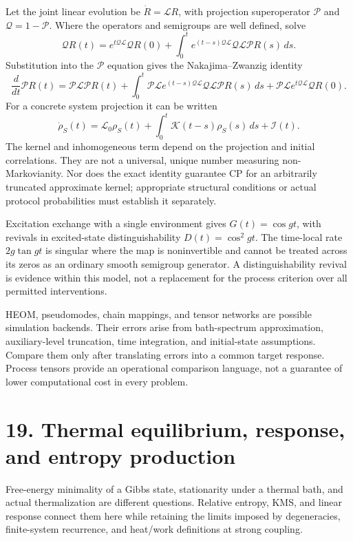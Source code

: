\documentclass[
  11pt,
  oneside]{book}
\begin{document}
Let the joint linear evolution be \(\dot R=\mathcal LR\), with
projection superoperator \(\mathcal P\) and \(\mathcal Q=1-\mathcal P\).
Where the operators and semigroups are well defined, solve \[
\mathcal QR(t)=e^{t\mathcal Q\mathcal L}\mathcal QR(0)
+\int_0^t e^{(t-s)\mathcal Q\mathcal L}
\mathcal Q\mathcal L\mathcal PR(s)\,ds.
\] Substitution into the \(\mathcal P\) equation gives the
Nakajima--Zwanzig identity \[
\frac d{dt}\mathcal PR(t)=\mathcal P\mathcal L\mathcal PR(t)
+\int_0^t\mathcal P\mathcal L e^{(t-s)\mathcal Q\mathcal L}
\mathcal Q\mathcal L\mathcal PR(s)\,ds
+\mathcal P\mathcal L e^{t\mathcal Q\mathcal L}\mathcal QR(0).
\] For a concrete system projection it can be written \[
\dot\rho_S(t)=\mathcal L_0\rho_S(t)
+\int_0^t\mathcal K(t-s)\rho_S(s)\,ds+\mathcal I(t).
\] The kernel and inhomogeneous term depend on the projection and
initial correlations. They are not a universal, unique number measuring
non-Markovianity. Nor does the exact identity guarantee CP for an
arbitrarily truncated approximate kernel; appropriate structural
conditions or actual protocol probabilities must establish it
separately.

Excitation exchange with a single environment gives \(G(t)=\cos gt\),
with revivals in excited-state distinguishability \(D(t)=\cos^2gt\). The
time-local rate \(2g\tan gt\) is singular where the map is noninvertible
and cannot be treated across its zeros as an ordinary smooth semigroup
generator. A distinguishability revival is evidence within this model,
not a replacement for the process criterion over all permitted
interventions.

HEOM, pseudomodes, chain mappings, and tensor networks are possible
simulation backends. Their errors arise from bath-spectrum
approximation, auxiliary-level truncation, time integration, and
initial-state assumptions. Compare them only after translating errors
into a common target response. Process tensors provide an operational
comparison language, not a guarantee of lower computational cost in
every problem.

\chapter{19. Thermal equilibrium, response, and entropy
production}\label{ch-19}

Free-energy minimality of a Gibbs state, stationarity under a thermal
bath, and actual thermalization are different questions. Relative
entropy, KMS, and linear response connect them here while retaining the
limits imposed by degeneracies, finite-system recurrence, and heat/work
definitions at strong coupling.
\end{document}
